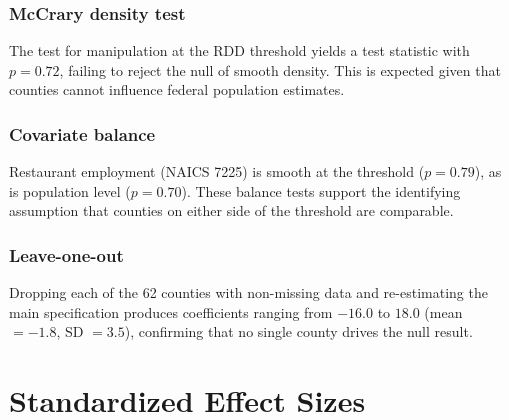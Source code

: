 \documentclass[12pt]{article}
\begin{document}
\subsubsection*{McCrary density test} The \citet{mccrary2008manipulation} test for manipulation at the RDD threshold yields a test statistic with $p = 0.72$, failing to reject the null of smooth density. This is expected given that counties cannot influence federal population estimates.

\subsubsection*{Covariate balance} Restaurant employment (NAICS 7225) is smooth at the threshold ($p = 0.79$), as is population level ($p = 0.70$). These balance tests support the identifying assumption that counties on either side of the threshold are comparable.

\subsubsection*{Leave-one-out} Dropping each of the 62 counties with non-missing data and re-estimating the main specification produces coefficients ranging from $-16.0$ to $18.0$ (mean $= -1.8$, SD $= 3.5$), confirming that no single county drives the null result.

\section{Standardized Effect Sizes}
\label{sec:sde}


\end{document}
